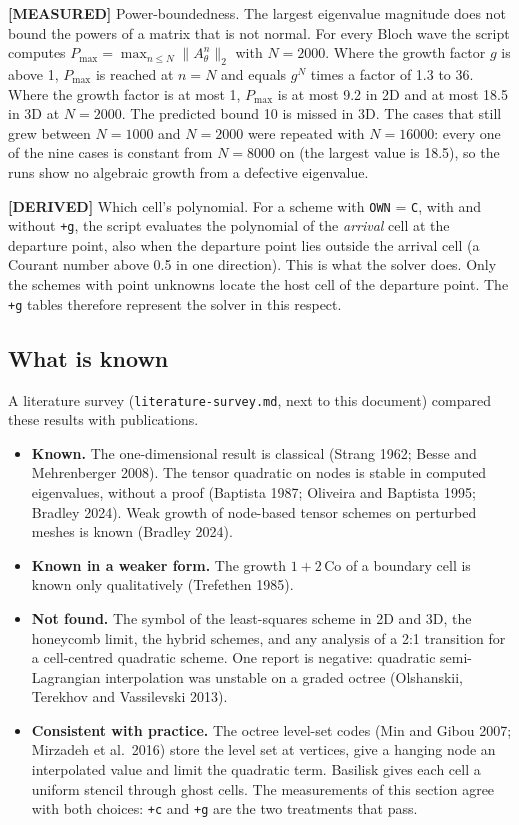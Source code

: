 \documentclass[11pt,a4paper]{article}
\newcommand{\derived}{\textcolor{blue!50!black}{\textbf{[DERIVED]}}}
\newcommand{\measured}{\textcolor{green!35!black}{\textbf{[MEASURED]}}}
\begin{document}
\measured{} Power-boundedness. The largest eigenvalue magnitude does not bound the powers of
a matrix that is not normal. For every Bloch wave the script computes
$P_{\max}=\max_{n\le N}\|A_\theta^n\|_2$ with $N=2000$. Where the growth factor $g$ is
above 1, $P_{\max}$ is reached at $n=N$ and equals $g^N$ times a factor of 1.3 to 36.
Where the growth factor is at most 1, $P_{\max}$ is at most 9.2 in 2D and at most 18.5 in
3D at $N=2000$. The predicted bound 10 is missed in 3D. The cases that still grew between
$N=1000$ and $N=2000$ were repeated with $N=16000$: every one of the nine cases is constant
from $N=8000$ on (the largest value is 18.5), so the runs show no algebraic growth from a
defective eigenvalue.

\derived{} Which cell's polynomial. For a scheme with \texttt{OWN} = \texttt{C}, with and
without \texttt{+g}, the script evaluates the polynomial of the \emph{arrival} cell at the
departure point, also when the departure point lies outside the arrival cell (a Courant
number above 0.5 in one direction). This is what the solver does. Only the schemes with
point unknowns locate the host cell of the departure point. The \texttt{+g} tables
therefore represent the solver in this respect.

\subsection{What is known}

A literature survey (\texttt{literature-survey.md}, next to this document) compared these
results with publications.
\begin{itemize}
  \item \textbf{Known.} The one-dimensional result is classical (Strang 1962; Besse and
        Mehrenberger 2008). The tensor quadratic on nodes is stable in computed
        eigenvalues, without a proof (Baptista 1987; Oliveira and Baptista 1995; Bradley
        2024). Weak growth of node-based tensor schemes on perturbed meshes is known
        (Bradley 2024).
  \item \textbf{Known in a weaker form.} The growth $1 + 2\,\mathrm{Co}$ of a boundary
        cell is known only qualitatively (Trefethen 1985).
  \item \textbf{Not found.} The symbol of the least-squares scheme in 2D and 3D, the
        honeycomb limit, the hybrid schemes, and any analysis of a 2:1 transition for a
        cell-centred quadratic scheme. One report is negative: quadratic semi-Lagrangian
        interpolation was unstable on a graded octree (Olshanskii, Terekhov and
        Vassilevski 2013).
  \item \textbf{Consistent with practice.} The octree level-set codes (Min and Gibou
        2007; Mirzadeh et al.\ 2016) store the level set at vertices, give a hanging node
        an interpolated value and limit the quadratic term. Basilisk gives each cell a
        uniform stencil through ghost cells. The measurements of this section agree with
        both choices: \texttt{+c} and \texttt{+g} are the two treatments that pass.
\end{itemize}
\end{document}
